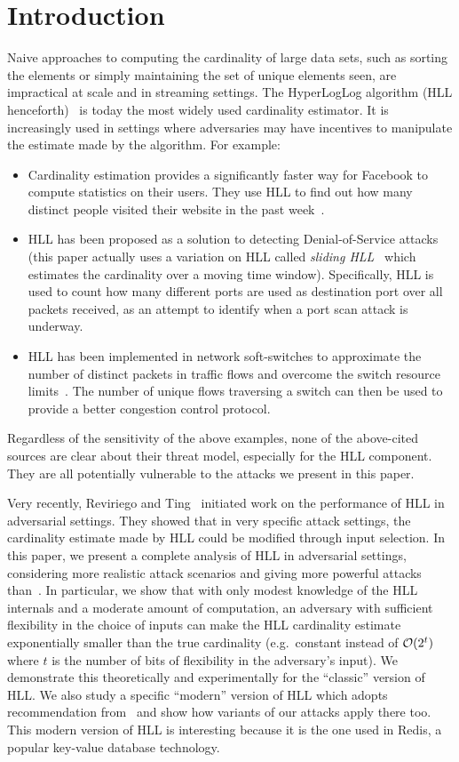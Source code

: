 \documentclass{article}
\begin{document}
\section{Introduction}
Naive approaches to computing the cardinality of large data sets, such as sorting the elements or simply maintaining the set of unique elements seen, are impractical at scale and in streaming settings. The HyperLogLog algorithm (HLL henceforth)~\cite{hll} is today the most widely used cardinality estimator. It is increasingly used in settings where adversaries may have  incentives to manipulate the estimate made by the algorithm. For example:
\begin{itemize}
    \item Cardinality estimation provides a significantly faster way for Facebook to compute statistics on their users. They use HLL to find out how many distinct people visited their website in the past week~\cite{fbhll}.
    \item HLL has been proposed as a solution to detecting Denial-of-Service attacks~\cite{portscanhll} (this paper actually uses a variation on HLL called \emph{sliding HLL}~\cite{slidinghll} which estimates the cardinality over a moving time window). Specifically, HLL is used to count how many different ports are used as destination port over all packets received, as an attempt to identify when a port scan attack is underway.
    \item HLL has been implemented in network soft-switches to approximate the number of distinct packets in traffic flows and overcome the switch resource limits~\cite{flexswitch}. The number of unique flows traversing a switch can then be used to provide a better congestion control protocol.
\end{itemize}

Regardless of the sensitivity of the above examples, none of the above-cited sources are clear about their threat model, especially for the HLL component. They are all potentially vulnerable to the attacks we present in this paper.

Very recently, Reviriego and Ting~\cite{hllvuln} initiated work on the performance of HLL in adversarial settings. They showed that in very specific attack settings, the cardinality estimate made by HLL could be modified through input selection. In this paper, we present a complete analysis of HLL in adversarial settings, considering more realistic attack scenarios and giving more powerful attacks than~\cite{hllvuln}. In particular, we show that with only modest knowledge of the HLL internals and a moderate amount of computation, an adversary with sufficient flexibility in the choice of inputs can make the HLL cardinality estimate exponentially smaller than the true cardinality (e.g.\ constant instead of ${\cal O}(2^t)$ where $t$ is the number of bits of flexibility in the adversary's input). We demonstrate this theoretically and experimentally for the ``classic'' version of HLL. We also study a specific ``modern'' version of HLL which adopts recommendation from~\cite{hllnew} and show how variants of our attacks apply there too. This modern version of HLL is interesting because it is the one used in Redis, a popular key-value database technology.
\end{document}
